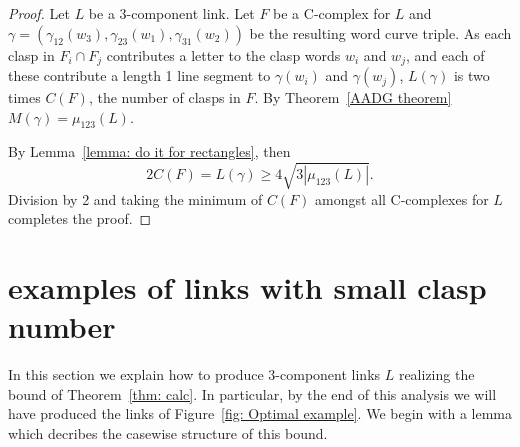 \documentclass[11pt]{amsart}
\theoremstyle{remark}
\begin{document}
\begin{proof}%
Let $L$ be a 3-component link. Let $F$ be a C-complex for $L$ and $\gamma=(\gamma_{12}(w_3), \gamma_{23}(w_1), \gamma_{31}(w_2))$ be the resulting word curve triple.  As each clasp in $F_i\cap F_j$ contributes a letter to the clasp words $w_i$ and $w_j$, and each of these contribute a length 1 line segment to $\gamma(w_i)$ and $\gamma(w_j)$, $L(\gamma)$ is two times $C(F)$, the number of clasps in $F$. By Theorem~\ref{AADG theorem} $M(\gamma) = \mu_{123}(L)$.

By Lemma~\ref{lemma: do it for rectangles}, then 
$$
2C(F)=L(\gamma)\ge 4\sqrt{3|\mu_{123}(L)|}.
$$
Division by 2 and taking the minimum of $C(F)$ amongst all C-complexes for $L$ completes the proof. 
\end{proof}

\section{examples of links with small clasp number}\label{sect:examples}

In this section we explain how to produce $3$-component links $L$ realizing the bound of Theorem~\ref{thm: calc}.  In particular, by the end of this analysis we will have produced the links of Figure~\ref{fig: Optimal example}.     We begin with a lemma which decribes the casewise structure of this bound.  
\end{document}
